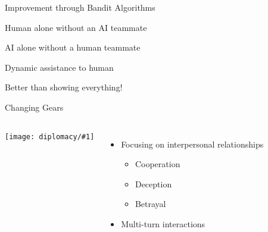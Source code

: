 \documentclass[compress]{beamer}
\newcommand{\fsi}[2]{
\begin{frame}[plain]
\vspace*{-1pt}
\makebox[\linewidth]{\texttt{[image: \#1]}}
\begin{center}
#2
\end{center}
\end{frame}
}
\newcommand{\gfxd}[2]{
	\begin{center}
		\texttt{[image: diplomacy/\#1]}
	\end{center}
}
\newcommand{\gfxq}[2]{
\begin{center}
	\texttt{[image: qb/\#1]}
\end{center}
}
\begin{document}
\begin{frame}{Improvement through Bandit Algorithms}

  \only<1>{\gfxq{rl_centaur_2}{.9}}
  \only<2>{\gfxq{rl_centaur_3}{.9}}
  \only<3>{\gfxq{rl_centaur_4}{.9}}
  \only<4>{\gfxq{rl_centaur_5}{.9}}
  \only<5>{\gfxq{rl_centaur_6}{.9}}

\end{frame}

\fsi{qb/augment/bandit_result_none}{Human alone without an AI teammate}
\fsi{qb/augment/bandit_result_ai}{AI alone without a human teammate}
\fsi{qb/augment/bandit_result_dynamic}{Dynamic assistance to human}
\fsi{qb/augment/bandit_result}{Better than showing everything!}

    

\begin{frame}{Changing Gears}

\begin{columns}
	
	\gfxd{cicero_science}{1.0}
\begin{itemize}
	\item Focusing on interpersonal relationships
\begin{itemize}
	\item Cooperation
	\item Deception
	\item Betrayal
\end{itemize}
\item Multi-turn interactions
\end{itemize}

\end{columns}


\end{frame}
\end{document}

